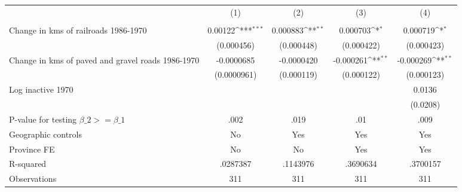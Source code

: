 {
\def\sym#1{\ifmmode^{#1}\else\(^{#1}\)\fi}
\begin{tabular}{l*{4}{c}}
\hline\hline
                &\multicolumn{1}{c}{(1)}&\multicolumn{1}{c}{(2)}&\multicolumn{1}{c}{(3)}&\multicolumn{1}{c}{(4)}\\
                &\multicolumn{1}{c}{}&\multicolumn{1}{c}{}&\multicolumn{1}{c}{}&\multicolumn{1}{c}{}\\
\hline
Change in kms of railroads 1986-1970&  0.00122\sym{***}& 0.000883\sym{**} & 0.000703\sym{*}  & 0.000719\sym{*}  \\
                &(0.000456)         &(0.000448)         &(0.000422)         &(0.000423)         \\
[1em]
Change in kms of paved and gravel roads 1986-1970&-0.0000685         &-0.0000420         &-0.000261\sym{**} &-0.000269\sym{**} \\
                &(0.0000961)         &(0.000119)         &(0.000122)         &(0.000123)         \\
[1em]
Log inactive 1970&                  &                  &                  &   0.0136         \\
                &                  &                  &                  & (0.0208)         \\
\hline
P-value for testing $\beta\_{2} >= \beta\_{1}$&     .002         &     .019         &      .01         &     .009         \\
Geographic controls&       No         &      Yes         &      Yes         &      Yes         \\
Province FE     &       No         &       No         &      Yes         &      Yes         \\
R-squared       & .0287387         & .1143976         & .3690634         & .3700157         \\
Observations    &      311         &      311         &      311         &      311         \\
\hline\hline
\end{tabular}
}
